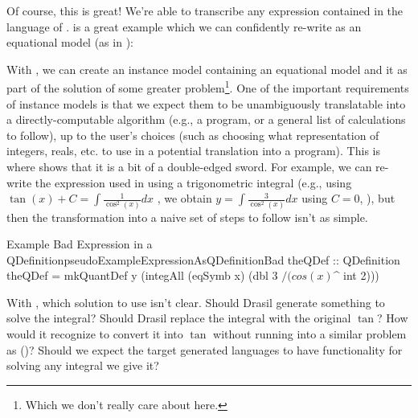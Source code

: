 \pseudoExampleExpression{}

Of course, this is great! We're able to transcribe any expression contained in
the language of \Expr{}.  is a great example which
we can confidently re-write as an equational model (as in
):


With , we can create an instance
model containing an equational model and it as part of the
solution of some greater problem\footnote{Which we don't really care about
here.}. One of the important requirements of instance models is that we expect
them to be unambiguously translatable into a directly-computable algorithm
(e.g., a program, or a general list of calculations to follow), up to the user's
choices (such as choosing what representation of integers, reals, etc. to use in
a potential translation into a program). This is where \Expr{} shows that it is
a bit of a double-edged sword. For example, we can re-write the expression used
in  using a trigonometric
integral (e.g., using \(\tan{}(x) + C = \int \frac{1}{\cos^2(x)}dx\)
\cite{Math2Org}, we obtain \(y = \int \frac{3}{\cos^2(x)}dx\) using \(C = 0\),
), but then the transformation
into a naive set of steps to follow isn't as simple.

\begin{pseudohaskell}{Example Bad Expression in a QDefinition}{pseudoExampleExpressionAsQDefinitionBad}
theQDef :: QDefinition
theQDef = mkQuantDef y (integAll (eqSymb x) (dbl 3 $/ (cos (x) $^ int 2)))
\end{pseudohaskell}

With , which solution to use
isn't clear. Should Drasil generate something to solve the integral? Should
Drasil replace the integral with the original $\tan$? How would it recognize to
convert it into $\tan$ without running into a similar problem as \relToQD{}
()? Should we expect the target generated languages to
have functionality for solving any integral we give it?

